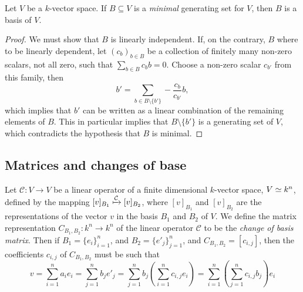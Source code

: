 \begin{lemma}
    \label{lem:minimal-generating-is-basis}
    Let \(V\) be a \(k\)-vector space. If \(B \subseteq V\) is a \emph{minimal}
    generating set for \(V\), then \(B\) is a basis of \(V\).
\end{lemma}

\begin{proof}
    We must show that \(B\) is linearly independent. If, on the contrary, \(B\)
    where to be linearly dependent, let \((c_b)_{b \in B}\) be a collection of
    finitely many non-zero scalars, not all zero, such that \(\sum_{b \in B} c_b b =
    0\). Choose a non-zero scalar \(c_{b'}\) from this family, then
    \[
        b' = \sum_{b \in B \setminus \{b'\}} - \frac{c_{b}}{c_{b'}} b,
    \]
    which implies that \(b'\) can be written as a linear combination of the
    remaining elements of \(B\). This in particular implies that \(B \setminus
    \{b'\}\) is a generating set of \(V\), which contradicts the hypothesis that
    \(B\) is minimal.
\end{proof}

\subsection{Matrices and changes of base}

\begin{definition}
    \label{def: change of basis matrix}
    Let \(\mathcal C : V \to V\) be a linear operator of a finite dimensional
    \(k\)-vector space, \(V \simeq k^n\), defined by the mapping \([v]_{B_1}
    \xmapsto{\mathcal C} [v]_{B_2}\), where \([v]_{B_1}\) and \([v]_{B_2}\) are the
    representations of the vector \(v\) in the basis \(B_1\) and \(B_2\) of \(V\).
    We define the matrix representation \(C_{B_1, B_2} : k^n \to k^n\) of the
    linear operator \(\mathcal C\) to be the \emph{change of basis matrix}. Then
    if \(B_1 = \{e_i\}_{i=1}^n\), and \(B_2 = \{e'_j\}_{j=1}^n\), and \(C_{B_1,
            B_2} = [c_{i, j}]\), then the coefficients \(c_{i, j}\) of \(C_{B_1, B_2}\)
    must be such that
    \[
        v = \sum_{i=1}^n a_i e_i = \sum_{j=1}^n b_j e'_j
        = \sum_{j=1}^n b_j \left( \sum_{i=1}^n c_{i, j} e_i \right)
        = \sum_{i=1}^n \left( \sum_{j=1}^n c_{i, j} b_j \right) e_i
    \]
\end{definition}

